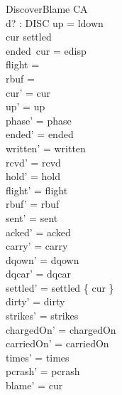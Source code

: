 \documentclass[a4paper,10pt,fleqn]{article}
\begin{document}
\begin{schema}{DiscoverBlame}
  \Delta CA \\
  d? : DISC
\where
  up = ldown \\
  cur \notin settled \\
  ended~cur = edisp \\
  flight = \emptyset \\
  rbuf = \emptyset \\
  cur' = cur \\
  up' = up \\
  phase' = phase \\
  ended' = ended \\
  written' = written \\
  rcvd' = rcvd \\
  hold' = hold \\
  flight' = flight \\
  rbuf' = rbuf \\
  sent' = sent \\
  acked' = acked \\
  carry' = carry \\
  dqown' = dqown \\
  dqcar' = dqcar \\
  settled' = settled \cup \{ cur \} \\
  dirty' = dirty \\
  strikes' = strikes \\
  chargedOn' = chargedOn \\
  carriedOn' = carriedOn \\
  times' = times \\
  pcrash' = pcrash \\
  blame' = cur
\end{schema}
\end{document}
